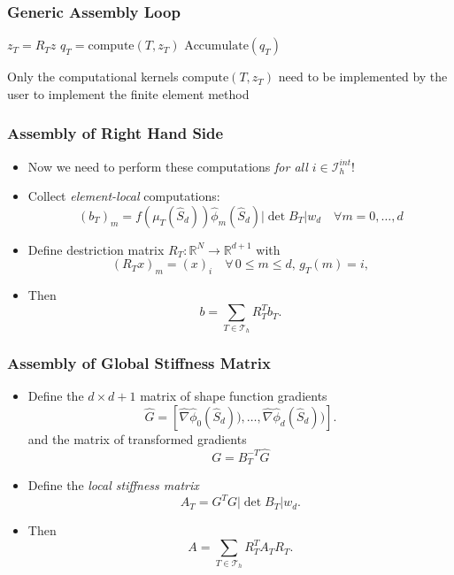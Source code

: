 \documentclass[ignorenonframetext,11pt]{beamer}
\theoremstyle{definition}
\begin{document}
\begin{frame}
\frametitle{Generic Assembly Loop}
\begin{algorithmic}[1]
 
\State $z_T = R_T z$ 
\State $q_T=\text{compute}(T,z_T)$ 
\State $\text{Accumulate}(q_T)$ 
\EndFor
\end{algorithmic}
Only the computational kernels $\text{compute}(T,z_T)$ need to be implemented by the user
to implement the finite element method
\end{frame}

\begin{frame}
\frametitle{Assembly of Right Hand Side}
\begin{itemize}
\item Now we need to perform these computations {\em for all $i\in\mathcal{I}_h^{int}$}!
\item Collect {\em element-local} computations:
\begin{equation*}
(b_T)_m =  f(\mu_T(\hat S_d)) \hat\phi_m(\hat S_d) |\det B_T| w_d \quad \forall m=0,\ldots,d
\end{equation*}
\item Define {destriction matrix} $R_T : \mathbb{R}^N \to \mathbb{R}^{d+1}$ with
\begin{equation*}
(R_T x)_m = (x)_i \quad \forall \,0\leq m \leq d, \,g_T(m)=i,
\end{equation*}
\item Then
\begin{equation*}
b = \sum_{T\in\mathcal{T}_h} R_T^T b_T .
\end{equation*}
\end{itemize}
\end{frame}

\begin{frame}
\frametitle{Assembly of Global Stiffness Matrix}
\begin{itemize}
\item Define the $d\times d+1$ matrix of shape function gradients
\begin{equation*}
\hat G = \left[\hat\nabla\hat\phi_0(\hat S_d)),\ldots,\hat\nabla\hat\phi_d(\hat S_d))\right] .
\end{equation*}
and the matrix of transformed gradients $$G=B_T^{-T} \hat G$$
\item Define the {\em local stiffness matrix}
\begin{equation*}
A_T = G^T G |\det B_T| w_d .
\end{equation*}
\item Then
\begin{equation*}
A =  \sum_{T\in\mathcal{T}_h} R_T^T A_T R_T .
\end{equation*}
\end{itemize}
\end{frame}
\end{document}

